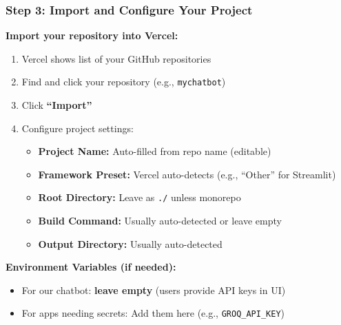 \begin{frame}[fragile]\frametitle{Step 3: Import and Configure Your Project}
\textbf{Import your repository into Vercel:}

  \begin{enumerate}
    \item Vercel shows list of your GitHub repositories
    \item Find and click your repository (e.g., \texttt{mychatbot})
    \item Click \textbf{``Import''}
    \item Configure project settings:
      \begin{itemize}
        \item \textbf{Project Name:} Auto-filled from repo name (editable)
        \item \textbf{Framework Preset:} Vercel auto-detects (e.g., ``Other'' for Streamlit)
        \item \textbf{Root Directory:} Leave as \texttt{./} unless monorepo
        \item \textbf{Build Command:} Usually auto-detected or leave empty
        \item \textbf{Output Directory:} Usually auto-detected
      \end{itemize}
  \end{enumerate}

\textbf{Environment Variables (if needed):}
  \begin{itemize}
    \item For our chatbot: \textbf{leave empty} (users provide API keys in UI)
    \item For apps needing secrets: Add them here (e.g., \texttt{GROQ\_API\_KEY})
  \end{itemize}
\end{frame}


